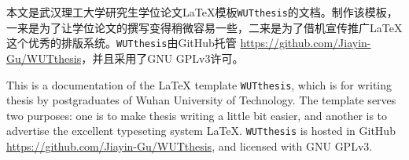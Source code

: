 
\begin{WUTChineseabstract}
\par 本文是武汉理工大学研究生学位论文{\LaTeX}模板\texttt{WUTthesis}的文档。制作该模板，一来是为了让学位论文的撰写变得稍微容易一些，二来是为了借机宣传推广{\LaTeX}这个优秀的排版系统。\texttt{WUTthesis}由GitHub托管 \url{https://github.com/Jiayin-Gu/WUTthesis}，并且采用了GNU GPLv3许可。
\end{WUTChineseabstract}



















\begin{WUTEnglishabstract}
\par This is a documentation of the {\LaTeX} template \texttt{WUTthesis}, which is for writing thesis by postgraduates of Wuhan University of Technology. The template serves two purposes: one is to make thesis writing a little bit easier, and another is to advertise the excellent typeseting system {\LaTeX}. \texttt{WUTthesis} is hosted in GitHub \url{https://github.com/Jiayin-Gu/WUTthesis}, and licensed with GNU GPLv3.
\end{WUTEnglishabstract}









